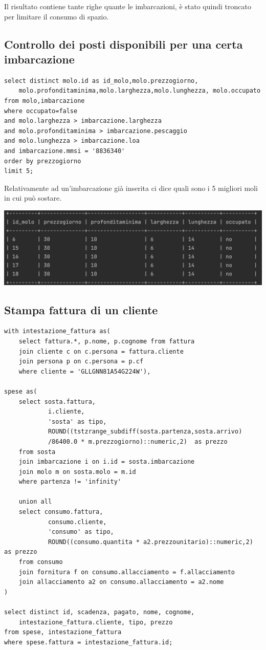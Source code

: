 Il risultato contiene tante righe quante le imbarcazioni, è stato quindi troncato per limitare il consumo di spazio.

\subsection{Controllo dei posti disponibili per una certa imbarcazione}
\begin{lstlisting}
select distinct molo.id as id_molo,molo.prezzogiorno,
    molo.profonditaminima,molo.larghezza,molo.lunghezza, molo.occupato
from molo,imbarcazione
where occupato=false
and molo.larghezza > imbarcazione.larghezza
and molo.profonditaminima > imbarcazione.pescaggio
and molo.lunghezza > imbarcazione.loa
and imbarcazione.mmsi = '8836340'
order by prezzogiorno
limit 5;
\end{lstlisting}

Relativamente ad un'imbarcazione già inserita ci dice quali sono i 5 migliori moli in cui può sostare.

\begin{center}
    \includegraphics[width= 0.8\linewidth]{img/result_molidisponibili.png}
\end{center}

\subsection{Stampa fattura di un cliente}

\begin{lstlisting}
with intestazione_fattura as(
    select fattura.*, p.nome, p.cognome from fattura
    join cliente c on c.persona = fattura.cliente
    join persona p on c.persona = p.cf
    where cliente = 'GLLGNN81A54G224W'),

spese as(
    select sosta.fattura,
            i.cliente,
            'sosta' as tipo,
            ROUND((tstzrange_subdiff(sosta.partenza,sosta.arrivo)
            /86400.0 * m.prezzogiorno)::numeric,2)  as prezzo
    from sosta
    join imbarcazione i on i.id = sosta.imbarcazione
    join molo m on sosta.molo = m.id
    where partenza != 'infinity'

    union all
    select consumo.fattura,
            consumo.cliente,
            'consumo' as tipo,
            ROUND((consumo.quantita * a2.prezzounitario)::numeric,2) as prezzo
    from consumo
    join fornitura f on consumo.allacciamento = f.allacciamento
    join allacciamento a2 on consumo.allacciamento = a2.nome
)

select distinct id, scadenza, pagato, nome, cognome,
    intestazione_fattura.cliente, tipo, prezzo
from spese, intestazione_fattura
where spese.fattura = intestazione_fattura.id;
\end{lstlisting}


